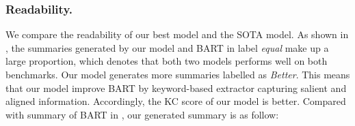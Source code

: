 \subsubsection{Readability.}
We compare the readability of our best model and the SOTA model.
As shown in , 
the summaries generated by our model and BART in label
{\em equal} make up a large proportion,
which denotes that both two models performs well on both benchmarks.
Our model generates
more summaries labelled as {\em Better}.
This means that our model improve BART by 
keyword-based extractor capturing salient and aligned information.
Accordingly, the KC score of our model is better.
Compared with summary of BART in ,
our generated summary is as follow:
\begin{table}[ht!]
	\centering
	\scriptsize
    \caption{The Read and KC of generated summaries.}
	\label{tab:read}
\end{table}


